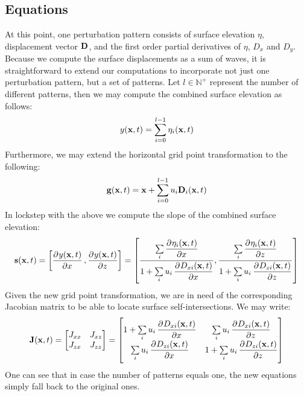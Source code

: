 \subsection{Equations}
At this point, one perturbation pattern consists of surface
elevation $\eta$, displacement vector $\mathbf{D}$, and the first order partial
derivatives of $\eta$, $D_x$ and $D_y$. Because we compute the surface
displacements as a sum of waves, it is straightforward to extend our
computations to incorporate not just one perturbation pattern, but a set of
patterns. Let $l \in \mathbb{N}^+$ represent the number of different patterns,
then we may compute the combined surface elevation as follows:
\begin{equation}
 y(\mathbf{x},t) = \sum\limits_{i=0}^{l-1}\eta_i(\mathbf{x},t)
\end{equation}
Furthermore, we may extend the horizontal grid point transformation to the
following:
\begin{equation}
\mathbf{g}(\mathbf{x},t) = \mathbf{x}+\sum\limits_{i=0}^{l-1}u_i\mathbf{D}_i(\mathbf{x},t) 
\end{equation}
In lockstep with the above we compute the slope of the combined surface elevation:
\begin{equation}
\mvec{s}(\mvec{x},t) = \left[\dpd{y(\mvec{x},t)}{x},\dpd{y(\mvec{x},t)}{z}\right] = \left[\frac{\sum\limits_i \dpd{\eta_i(\mvec{x},t)}{x}}{1 
+ \sum\limits_i u_i \dpd{D_{xi}(\mvec{x},t)}{x}}, \frac{\sum\limits_i 
\dpd{\eta_i(\mvec{x},t)}{z}}{1 + \sum\limits_i 
u_i\dpd{D_{zi}(\mvec{x},t)}{z}}\right]
\end{equation}
Given the new grid point transformation, we are in need of the corresponding
Jacobian matrix to be able to locate surface self-intersections. We may write:
\begin{equation}
\label{eq:jacobian_of_displacement_multi}
 \mvec{J}(\mvec{x},t) =
 \begin{bmatrix}
 J_{xx} & J_{xz} \\
 J_{zx} & J_{zz}
 \end{bmatrix}
 =
 \begin{bmatrix}
   1 + \sum\limits_i u_i\dpd{D_{xi}(\mvec{x},t)}{x} & \sum\limits_i u_i\dpd{D_{xi}(\mvec{x},t)}{z} \\
   \sum\limits_i u_i\dpd{D_{zi}(\mvec{x},t)}{x} & 1 + \sum\limits_i u_i\dpd{D_{zi}(\mvec{x},t)}{z}
 \end{bmatrix}
\end{equation}
%
One can see that in case the number of patterns equals one, the new equations
simply fall back to the original ones.
